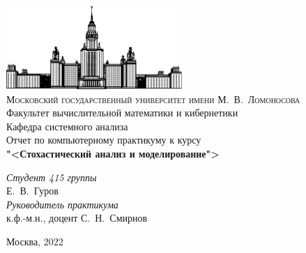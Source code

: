 \begin{titlepage}
    \begin{centering}
        \includegraphics[width=0.5\textwidth]{resources/msu.png}\\
        {\scshape Московский государственный университет имени М.~В.~Ломоносова}\\
        Факультет вычислительной математики и кибернетики\\
        Кафедра системного анализа\\
        \vfill
        {\LARGE Отчет по компьютерному практикуму к курсу}\\
        \vspace{1cm}
        {\Huge\bfseries "<Стохастический анализ и моделирование">\\}
    \end{centering}
    \vspace{1cm}
    \begin{flushright}
        \begin{large}
            {\itshape Студент 415 группы\\}
            Е.~В.~Гуров\\
            \vspace{5mm}
            {\itshape Руководитель практикума\\}
            к.ф.-м.н., доцент С.~Н.~Смирнов\\
        \end{large}
    \end{flushright}
    \vfill
    \begin{centering}
        Москва, 2022\\ 
    \end{centering}
\end{titlepage}